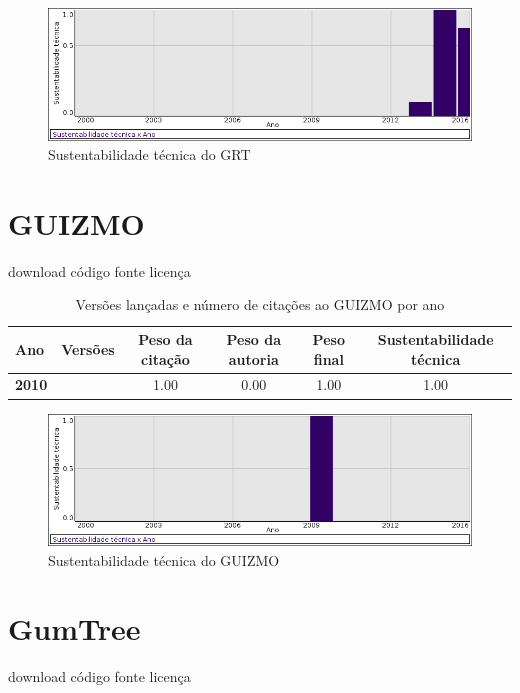 \begin{figure}[h]
  \center
  \includegraphics[scale=0.50]{imagens/softwares-charts/grt.png}
  \caption{Sustentabilidade técnica do GRT}
\end{figure}


\section{GUIZMO}
\checkmark download
\checkmark código fonte
\checkmark licença


\begin{table}[H]
\caption{Versões lançadas e número de citações ao GUIZMO por ano}
\centering
\begin{tabular}{| l | c | c | c | c | c |}
  \hline
  Ano & Versões & Peso da citação & Peso da autoria & Peso final & Sustentabilidade técnica \\
  \hline
            {\bf 2010}
          &
          
          &
          1.00
          &
          0.00
          &
          1.00
          &
            {\color{blue} 1.00}
          \\
\hline
\end{tabular}
\end{table}

\begin{figure}[h]
  \center
  \includegraphics[scale=0.50]{imagens/softwares-charts/guizmo.png}
  \caption{Sustentabilidade técnica do GUIZMO}
\end{figure}


\section{GumTree}
\checkmark download
\checkmark código fonte
\checkmark licença


